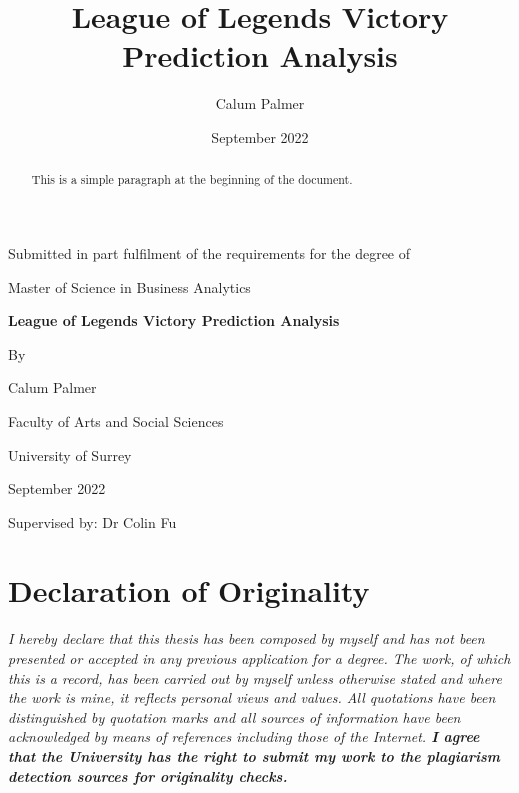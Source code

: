 \documentclass[11pt, A4]{report}
\title{League of Legends Victory Prediction Analysis}
\author{Calum Palmer}
\date{September 2022}
\begin{document}
    \begin{titlepage}
    \centering

    {\large Submitted in part fulfilment of the requirements for the degree of}
    \vspace{0.25cm}

    {\large Master of Science in Business Analytics}
    \vspace{2cm}

    {\huge\bfseries League of Legends Victory Prediction Analysis}
    \vspace{1.5cm}

    {By}
    \vspace{0.5cm}

    {\Large Calum Palmer}
    \vspace{5cm}



    {\large Faculty of Arts and Social Sciences}
    \vspace{0.5cm}

    {\large University of Surrey}
    \vspace{1cm}

    {\large September 2022}

    \vspace{1.5cm}
    {\large Supervised by: Dr Colin Fu}

    \vfill

    \end{titlepage}


    \begin{abstract}
    This is a simple paragraph at the beginning of the document.
    \end{abstract}

    \section{Declaration of Originality}\label{sec:declaration of originality}

    \emph{I hereby declare that this thesis has been composed by myself and has not been
    presented or accepted in any previous application for a degree. The work, of which
    this is a record, has been carried out by myself unless otherwise stated and where
    the work is mine, it reflects personal views and values. All quotations have been
    distinguished by quotation marks and all sources of information have been
    acknowledged by means of references including those of the Internet.
    \textbf{I agree that the University has the right to submit my work to the plagiarism
    detection sources for originality checks.}}
\end{document}
